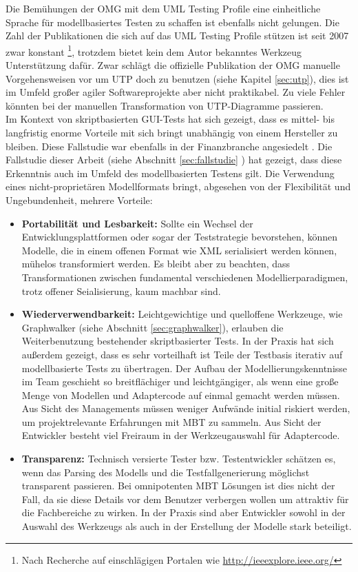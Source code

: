 Die Bemühungen der OMG mit dem UML Testing Profile eine einheitliche Sprache für modellbasiertes Testen zu schaffen ist ebenfalls nicht gelungen. Die Zahl der Publikationen die sich auf das UML Testing Profile stützen ist seit 2007 zwar konstant \footnote{Nach Recherche auf einschlägigen Portalen wie \url{http://ieeexplore.ieee.org/}}, trotzdem bietet kein dem Autor bekanntes Werkzeug Unterstützung dafür. Zwar schlägt die offizielle Publikation der OMG \cite{_model-driven_2007} manuelle Vorgehensweisen vor um UTP doch zu benutzen (siehe Kapitel \ref{sec:utp}), dies ist im Umfeld großer agiler Softwareprojekte aber nicht praktikabel. Zu viele Fehler könnten bei der manuellen Transformation von UTP-Diagramme passieren.\\
Im Kontext von skriptbasierten GUI-Tests hat sich gezeigt, dass es mittel- bis langfristig enorme Vorteile mit sich bringt unabhängig von einem Hersteller zu bleiben. Diese Fallstudie war ebenfalls in der Finanzbranche angesiedelt \cite{graham_experiences_2012}. Die Fallstudie dieser Arbeit (siehe Abschnitt \ref{sec:fallstudie} ) hat gezeigt, dass diese Erkenntnis auch im Umfeld des modellbasierten Testens gilt. Die Verwendung eines nicht-proprietären Modellformats bringt, abgesehen von der Flexibilität und Ungebundenheit, mehrere Vorteile:

\begin{itemize}
\item \textbf{Portabilität und Lesbarkeit:} Sollte ein Wechsel der Entwicklungsplattformen oder sogar der Teststrategie bevorstehen, können Modelle, die in einem offenen Format wie XML serialisiert werden können, mühelos transformiert werden. Es bleibt aber zu beachten, dass Transformationen zwischen fundamental verschiedenen Modellierparadigmen, trotz offener Seialisierung, kaum machbar sind.
\item \textbf{Wiederverwendbarkeit:} Leichtgewichtige und quelloffene Werkzeuge, wie Graphwalker (siehe Abschnitt \ref{sec:graphwalker}), erlauben die Weiterbenutzung bestehender skriptbasierter Tests. In der Praxis hat sich außerdem gezeigt, dass es sehr vorteilhaft ist Teile der Testbasis iterativ auf modellbasierte Tests zu übertragen. Der Aufbau der Modellierungskenntnisse im Team geschieht so breitflächiger und leichtgängiger, als wenn eine große Menge von Modellen und Adaptercode auf einmal gemacht werden müssen. Aus Sicht des Managements müssen weniger Aufwände initial riskiert werden, um projektrelevante Erfahrungen mit \Gls{MBT} zu sammeln. Aus Sicht der Entwickler besteht viel Freiraum in der Werkzeugauswahl für Adaptercode.
\item \textbf{Transparenz:} Technisch versierte Tester bzw. Testentwickler schätzen es, wenn das Parsing des Modells und die Testfallgenerierung möglichst transparent passieren. Bei omnipotenten \Gls{MBT} Lösungen ist dies nicht der Fall, da sie diese Details vor dem Benutzer verbergen wollen um attraktiv für die Fachbereiche zu wirken. In der Praxis sind aber Entwickler sowohl in der Auswahl des Werkzeugs als auch in der Erstellung der Modelle stark beteiligt.
\end{itemize}


